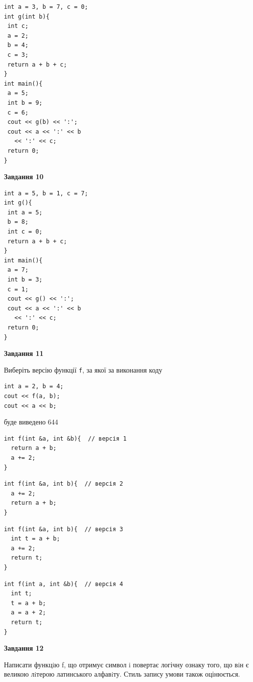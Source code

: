 \documentclass[12pt, ukrainian]{article}
\def\code#1{\Verb!#1!}
\begin{document}
{\begin {large}
\begin{minipage}[t]{7.0cm}
\begin{verbatim}
int a = 3, b = 7, c = 0;
int g(int b){
 int c;
 a = 2;
 b = 4;
 c = 3;
 return a + b + c;
}
int main(){
 a = 5;
 int b = 9;
 c = 6;
 cout << g(b) << ':';
 cout << a << ':' << b 
   << ':' << c;
 return 0;
}
\end{verbatim}



\begin{center}
\textbf{Завдання 10}
\end{center}
\vspace{-8mm}

\begin{verbatim}
int a = 5, b = 1, c = 7;
int g(){
 int a = 5;
 b = 8;
 int c = 0;
 return a + b + c;
}
int main(){
 a = 7;
 int b = 3;
 c = 1;
 cout << g() << ':';
 cout << a << ':' << b 
   << ':' << c;
 return 0;
}
\end{verbatim}

\end{minipage}
\vline \hspace{1mm}
\begin{minipage}[t]{11.0cm}

\begin{center}
\textbf{Завдання 11}
\end{center}
Виберіть версію функції \code{f}, за якої за виконання коду
\begin{verbatim}
int a = 2, b = 4;
cout << f(a, b);
cout << a << b;
\end{verbatim}

буде виведено 644

\begin{verbatim}
int f(int &a, int &b){  // версія 1
  return a + b;
  a += 2;
}
\end{verbatim}

\vspace{-8mm}\begin{verbatim}
int f(int &a, int b){  // версія 2
  a += 2;
  return a + b;
}
\end{verbatim}

\vspace{-8mm}\begin{verbatim}
int f(int &a, int b){  // версія 3
  int t = a + b;
  a += 2;
  return t;
}
\end{verbatim}

\vspace{-8mm}\begin{verbatim}
int f(int a, int &b){  // версія 4
  int t;
  t = a + b;
  a = a + 2;
  return t;
}
\end{verbatim}



\begin{center}
\textbf{Завдання 12}
\end{center}

Написати функцiю f, що отримує символ i повертає логічну ознаку того, що вiн є великою лiтерою латинського алфавiту. Стиль запису умови також оцінюється.\par

\end{minipage}

\end {large}}
\end{document}

